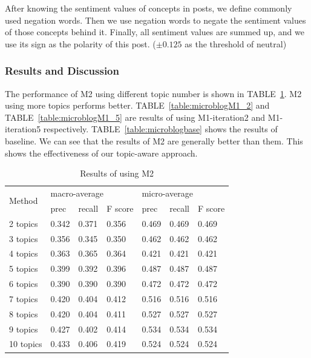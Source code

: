 After knowing the sentiment values of concepts in posts, we define commonly used negation words. Then we use negation words to negate the sentiment values of those concepts behind it. Finally, all sentiment values are summed up, and we use its sign as the polarity of this post. ($\pm 0.125$ as the threshold of neutral) 

\subsubsection{Results and Discussion}
The performance of M2 using different topic number is shown in TABLE~\ref{table:microblogM2}. M2 using more topics performs better. TABLE~\ref{table:microblogM1_2} and TABLE~\ref{table:microblogM1_5} are results of using M1-iteration2 and M1-iteration5 respectively. TABLE~\ref{table:microblogbase} shows the results of baseline. We can see that the results of M2 are generally better than them. This shows the effectiveness of our topic-aware approach. 

\begin{table}[!t]
\centering
\caption{Results of using M2}
\label{table:microblogM2}
\begin{tabular}{|l|l|l|l|l|l|l|}
\hline
\multirow{2}{*}{Method} & \multicolumn{3}{|l|}{macro-average} & \multicolumn{3}{|l|}{micro-average} \\ \cline{2-7}
& prec & recall & F score & prec & recall & F score \\ \hline
2 topics & 0.342 & 0.371 & 0.356 & 0.469 & 0.469 & 0.469 \\ \hline
3 topics & 0.356 & 0.345 & 0.350 & 0.462 & 0.462 & 0.462 \\ \hline
4 topics & 0.363 & 0.365 & 0.364 & 0.421 & 0.421 & 0.421 \\ \hline
5 topics & 0.399 & 0.392 & 0.396 & 0.487 & 0.487 & 0.487 \\ \hline
6 topics & 0.390 & 0.390 & 0.390 & 0.472 & 0.472 & 0.472 \\ \hline
7 topics & 0.420 & 0.404 & 0.412 & 0.516 & 0.516 & 0.516 \\ \hline
8 topics & 0.420 & 0.404 & 0.411 & 0.527 & 0.527 & 0.527 \\ \hline
9 topics & 0.427 & 0.402 & 0.414 & 0.534 & 0.534 & 0.534 \\ \hline
10 topics & 0.433 & 0.406 & 0.419 & 0.524 & 0.524 & 0.524 \\ \hline
\end{tabular}
\end{table}

